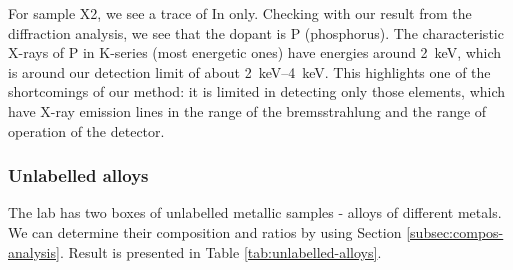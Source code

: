 \documentclass[11pt,a4paper,twoside,onecolumn]{article}
\begin{document}
For sample X2, we see a trace of In only. Checking with our result from the diffraction analysis, we see that the dopant is P (phosphorus). The characteristic X-rays of P in K-series (most energetic ones) have energies around \qty{2}{keV}, which is around our detection limit of about \qtyrange{2}{4}{keV}. This highlights one of the shortcomings of our method: it is limited in detecting only those elements, which have X-ray emission lines in the range of the bremsstrahlung and the range of operation of the detector.

\subsubsection{Unlabelled alloys}\label{subsubsec:unlabelled-alloys}
The lab has two boxes of unlabelled metallic samples - alloys of different metals. We can determine their composition and ratios by using Section \ref{subsec:compos-analysis}. Result is presented in Table \ref{tab:unlabelled-alloys}.
\end{document}
